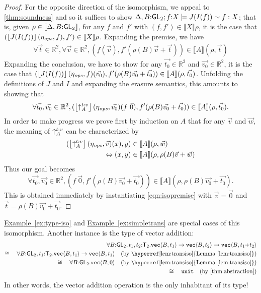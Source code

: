 \documentclass{sigplanconf}
\newcommand{\SynGL}[1]{\mathsf{GL}_#1}
\newcommand{\SynTransl}[1]{\mathsf{T}_#1}
\newcommand{\tyUnit}{\texttt{unit}}
\newcommand{\tyPrim}[2]{\textup{\texttt{#1}}\langle #2 \rangle}
\newcommand{\tmSem}[1]{\left\lfloor{#1}\right\rfloor}
\newcommand{\rsem}[1]{\llbracket #1 \rrbracket}
\newcommand{\lemref}[1]{\hyperref[#1]{Lemma~\ref*{#1}}}
\newcommand{\exref}[1]{\hyperref[#1]{Example~\ref*{#1}}}
\theoremstyle{examplestyle}
\theoremstyle{restatementstyle}
\begin{document}
\begin{proof}
For the opposite direction of the isomorphism, we appeal to 
\autoref{thm:soundness} and so it suffices to show
$\semeq{\DeltaWithB}{f\mathord:X}{J(I(f))}{f}{X}$; that
is, given $\rho\in\semSort\DeltaWithB$, for any $f$ and $f'$ with
$(f,f')\in\rsem X\rho$, it is the case that 
$(\tmSem{J(I(f))}(\opsEnv,f), f')\in\rsem X\rho$.
Expanding the premise, we have
\begin{eqnarray}\label{eqn:isopremise}
\forall \vec{t}\in \mathbb R ^ 2,
\forall \vec{v}\in \mathbb R ^ 2,
(f(\vec{v}),f'(\rho(B)\vec{v} + \vec{t}))\in\rsem A (\rho,\vec{t})
\end{eqnarray}
Expanding the conclusion, we have to show for any
$\vec{t_0}\in\mathbb R^2$ and $\vec{v_0}\in\mathbb R^2$, it is the case that
$(\tmSem{J(I(f))}(\opsEnv,f)(\vec{v_0}),f'(\rho(B)\vec{v_0} + \vec{t_0}))\in\rsem A (\rho,\vec{t_0})$.
Unfolding the definitions of $J$ and $I$ and expanding the erasure semantics, 
this amounts to showing that
\[
\forall \vec{t_0},\vec{v_0}\in \mathbb R ^ 2,
(\tmSem{\transup A t v}(\opsEnv,\vec{v_0})(f\ \vec 0),f'(\rho(B)\vec{v_0} + \vec{t_0}))\in\rsem A (\rho,\vec{t_0}).
\]
In order to make progress we prove first by induction on $A$ that for any $\vec v$ and $\vec w$, 
the meaning of $\mathord\uparrow_{A}^{t\mathord:v}$ can be characterized by
\begin{align*}
(\tmSem{\transup A t v}(\opsEnv,\vec{v})(x),y)&\in\rsem A (\rho,\vec{w})
\\\Leftrightarrow 
(x,y)&\in\rsem A (\rho,\rho(B)\vec{v} + \vec{w})
\end{align*}
Thus our goal becomes
\[
\forall \vec{t_0},\vec{v_0}\in \mathbb R ^ 2,
(f\ \vec 0,f'(\rho(B)\vec{v_0} + \vec{t_0}))\in\rsem A (\rho,\rho(B)\vec{v_0} + \vec{t_0}).
\]
This is obtained immediately by instantiating \autoref{eqn:isopremise}
with $\vec{v}=\vec 0$ and $\vec{t}=\rho(B)\vec{v_0} + \vec{t_0}$.
\end{proof}

\exref{ex:type-iso} and \exref{ex:simpletrans} are special cases of
this isomorphism. Another instance is the type of vector addition:
\begin{align*}
\forall B\mathord:\SynGL{2}, t_1, t_2\mathord:\SynTransl{2}.\tyPrim{vec}{B,t_1}\to\tyPrim{vec}{B,t_2}\to\tyPrim{vec}{B,t_1\mathord+t_2}\\
\cong\quad\forall B\mathord:\SynGL{2}, t_1\mathord:\SynTransl{2}.\tyPrim{vec}{B,t_1}\to\tyPrim{vec}{B,t_1}
\quad (\text{by~\lemref{lem:transiso}})\\
\cong\quad\forall B\mathord:\SynGL{2}.\tyPrim{vec}{B,0} \quad (\text{by~\lemref{lem:transiso}})\\
\cong\quad\tyUnit\quad(\text{by \autoref{thm:abstraction}})
\end{align*}
In other words, the vector addition operation is the only inhabitant of its type!
\end{document}
